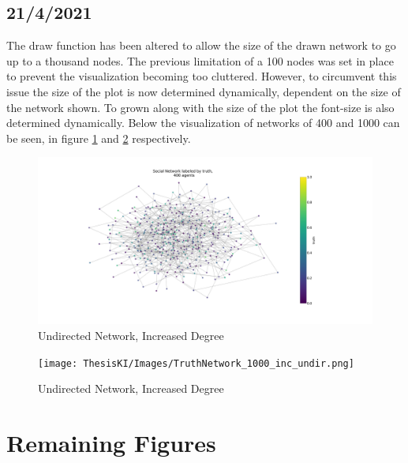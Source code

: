\documentclass{article}
\begin{document}
\newpage

\subsection{21/4/2021}

The draw function has been altered to allow the size of the drawn network to go up to a thousand nodes. The previous limitation of a 100 nodes was set in place to prevent the visualization becoming too cluttered. However, to circumvent this issue the size of the plot is now determined dynamically, dependent on the size of the network shown. To grown along with the size of the plot the font-size is also determined dynamically. Below the visualization of networks of 400 and 1000 can be seen, in figure \ref{network_400:increased} and \ref{network_1000:increased} respectively.
\begin{center}
    \begin{figure}[!htbp]
        \centering
        \includegraphics[width=.8\textwidth]{ThesisKI/Images/TruthNetwork_400_inc_undir.png}
        \caption{Undirected Network, Increased Degree}
        \label{network_400:increased}
    \end{figure}
\end{center}

\begin{center}
    \begin{figure}[!htbp]
        \centering
        \texttt{[image: ThesisKI/Images/TruthNetwork\_1000\_inc\_undir.png]}
        \caption{Undirected Network, Increased Degree}
        \label{network_1000:increased}
    \end{figure}
\end{center}

\newpage



\newpage

\section{Remaining Figures}
\end{document}
